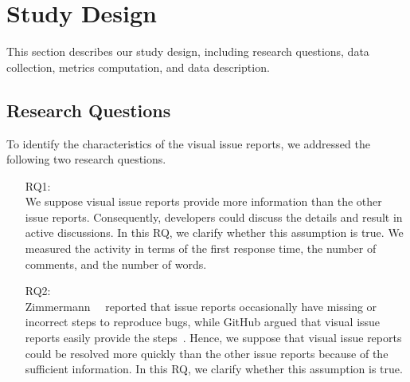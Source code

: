 \section{Study Design}
\label{sec:design}

This section describes our study design, including research questions, data collection, metrics computation, and data description.

\subsection{Research Questions}
\label{sec:rqs}

To identify the characteristics of the visual issue reports, we addressed the following two research questions. 
\begin{itemize}
	\item[RQ1:] \textbf{\RQone{}}\\
	We suppose visual issue reports provide 
	more information than the other issue reports. 
	Consequently, developers could discuss the details and 
	result in active discussions. 
	In this RQ, we clarify whether this assumption is true. 
	We measured the activity in terms of 
	the first response time, 
	the number of comments, and 
	the number of words. 
	\item[RQ2:] \textbf{\RQtwo{}}\\
	Zimmermann~\et~\citep{zimmermann2010TSE} reported that
	issue reports occasionally have missing or incorrect steps 
	to reproduce bugs, 
	while GitHub argued that visual issue reports easily 
	provide the steps~\citep{github-video-blog}. 
	Hence, we suppose that visual issue reports could be 
	resolved more quickly than the other issue reports 
	because of the sufficient information. 
	In this RQ, we clarify whether this assumption is true. 
\end{itemize}

